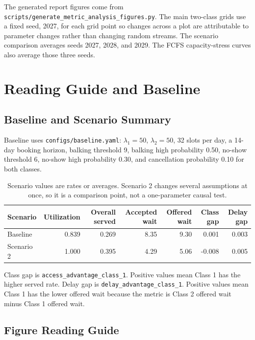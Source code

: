 \documentclass[11pt]{article}
\begin{document}
The generated report figures come from
\texttt{scripts/generate\_metric\_analysis\_figures.py}. The main two-class grids
use a fixed seed, 2027, for each grid point so changes across a plot are
attributable to parameter changes rather than changing random streams. The
scenario comparison averages seeds 2027, 2028, and 2029. The FCFS
capacity-stress curves also average those three seeds.

\section{Reading Guide and Baseline}

\subsection{Baseline and Scenario Summary}

Baseline uses \texttt{configs/baseline.yaml}: $\lambda_1 = 50$, $\lambda_2 = 50$, 32 slots per day, a 14-day booking horizon, balking threshold 9, balking high probability 0.50, no-show threshold 6, no-show high probability 0.30, and cancellation probability 0.10 for both classes.

\begin{table}[H]
\centering
\begin{tabular}{lrrrrrr}
\toprule
Scenario & Utilization & Overall served & Accepted wait & Offered wait & Class gap & Delay gap \\
\midrule
Baseline & 0.839 & 0.269 & 8.35 & 9.30 & 0.001 & 0.003 \\
Scenario 2 & 1.000 & 0.395 & 4.29 & 5.06 & -0.008 & 0.005 \\
\bottomrule
\end{tabular}
\caption{Scenario values are rates or averages. Scenario 2 changes several assumptions at once, so it is a comparison point, not a one-parameter causal test.}
\end{table}

Class gap is \texttt{access\_advantage\_class\_1}. Positive values mean Class 1
has the higher served rate. Delay gap is \texttt{delay\_advantage\_class\_1}.
Positive values mean Class 1 has the lower offered wait because the metric is
Class 2 offered wait minus Class 1 offered wait.

\subsection{Figure Reading Guide}
\end{document}
